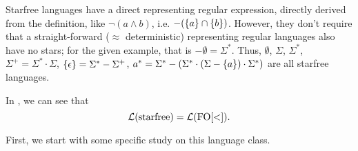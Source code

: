 Starfree languages have a direct representing regular expression, directly derived from the definition, like $\neg(a \wedge b)$, i.e. $-(\Set{a}\cap\Set{b})$. However, they don't require that a straight-forward ($\approx$ deterministic) representing regular languages also have no stars; for the given example, that is $-\emptyset = \Sigma^*$. Thus, $\emptyset$, $\Sigma$, $\Sigma^*$, $\Sigma^+ = \Sigma^* \cdot \Sigma$, $\Set{\epsilon} = \Sigma^* - \Sigma^+$, $a^* = \Sigma^* - (\Sigma^* \cdot (\Sigma - \Set{a}) \cdot \Sigma^*)$ are all starfree languages.

In \cite[Theorem 4.10]{LangAutLogicR102}, we can see that
\[ \mathcal{L}(\textup{\textrm{starfree}}) = \mathcal{L}(\mathrm{FO[<]}) . \]

First, we start with some specific study on this language class.

